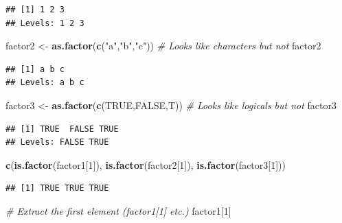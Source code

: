 \documentclass[]{book}
\newenvironment{Shaded}{\begin{snugshade}}{\end{snugshade}}
\newcommand{\KeywordTok}[1]{\textcolor[rgb]{0.13,0.29,0.53}{\textbf{{#1}}}}
\newcommand{\DecValTok}[1]{\textcolor[rgb]{0.00,0.00,0.81}{{#1}}}
\newcommand{\StringTok}[1]{\textcolor[rgb]{0.31,0.60,0.02}{{#1}}}
\newcommand{\CommentTok}[1]{\textcolor[rgb]{0.56,0.35,0.01}{\textit{{#1}}}}
\newcommand{\OtherTok}[1]{\textcolor[rgb]{0.56,0.35,0.01}{{#1}}}
\newcommand{\NormalTok}[1]{{#1}}
\theoremstyle{definition}
\theoremstyle{definition}
\theoremstyle{remark}
\begin{document}
\begin{verbatim}
## [1] 1 2 3
## Levels: 1 2 3
\end{verbatim}

\begin{Shaded}
\begin{Highlighting}[]
\NormalTok{factor2 <-}\StringTok{ }\KeywordTok{as.factor}\NormalTok{(}\KeywordTok{c}\NormalTok{(}\StringTok{"a"}\NormalTok{,}\StringTok{"b"}\NormalTok{,}\StringTok{"c"}\NormalTok{))  }\CommentTok{# Looks like characters but not}
\NormalTok{factor2}
\end{Highlighting}
\end{Shaded}

\begin{verbatim}
## [1] a b c
## Levels: a b c
\end{verbatim}

\begin{Shaded}
\begin{Highlighting}[]
\NormalTok{factor3 <-}\StringTok{ }\KeywordTok{as.factor}\NormalTok{(}\KeywordTok{c}\NormalTok{(}\OtherTok{TRUE}\NormalTok{,}\OtherTok{FALSE}\NormalTok{,T)) }\CommentTok{# Looks like logicals but not}
\NormalTok{factor3}
\end{Highlighting}
\end{Shaded}

\begin{verbatim}
## [1] TRUE  FALSE TRUE 
## Levels: FALSE TRUE
\end{verbatim}

\begin{Shaded}
\begin{Highlighting}[]
\KeywordTok{c}\NormalTok{(}\KeywordTok{is.factor}\NormalTok{(factor1[}\DecValTok{1}\NormalTok{]), }\KeywordTok{is.factor}\NormalTok{(factor2[}\DecValTok{1}\NormalTok{]), }\KeywordTok{is.factor}\NormalTok{(factor3[}\DecValTok{1}\NormalTok{]))}
\end{Highlighting}
\end{Shaded}

\begin{verbatim}
## [1] TRUE TRUE TRUE
\end{verbatim}

\begin{Shaded}
\begin{Highlighting}[]
\CommentTok{# Extract the first element (factor1[1] etc.) }
\NormalTok{factor1[}\DecValTok{1}\NormalTok{]}
\end{Highlighting}
\end{Shaded}
\end{document}
